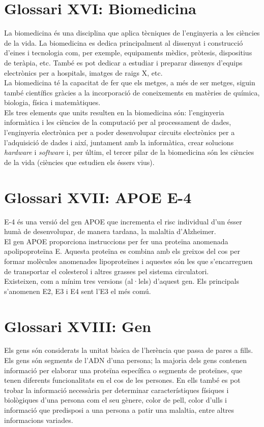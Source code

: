 \documentclass[a4paper,12pt]{report}
\begin{document}
\section*{Glossari XVI: Biomedicina}
La biomedicina és una disciplina que aplica tècniques de l'enginyeria a les ciències de la vida. La biomedicina es dedica principalment al dissenyat i construcció d'eines i tecnologia com, per exemple, equipaments mèdics, pròtesis, dispositius de teràpia, etc. També es pot dedicar a estudiar i preparar dissenys d'equips electrònics per a hospitals, imatges de raigs X, etc.\\
La biomedicina té la capacitat de fer que els metges, a més de ser metges, siguin també científics gràcies a la incorporació de coneixements en matèries de química, biologia, física i matemàtiques.\\
Els tres elements que units resulten en la biomedicina són: l'enginyeria informàtica i les ciències de la computació per al processament de dades, l'enginyeria electrònica per a poder desenvolupar circuits electrònics per a l'adquisició de dades i així, juntament amb la informàtica, crear solucions \textit{hardware} i \textit{software} i, per últim, el tercer pilar de la biomedicina són les ciències de la vida (ciències que estudien els éssers vius).
\section*{Glossari XVII: APOE E-4}
E-4 és una versió del gen APOE que incrementa el risc individual d'un ésser humà de desenvolupar, de manera tardana, la malaltia d'Alzheimer.\\
El gen APOE proporciona instruccions per fer una proteïna anomenada apolipoproteïna E. Aquesta proteïna es combina amb els greixos del cos per formar molècules anomenades lipoproteïnes i aquestes són les que s'encarreguen de transportar el colesterol i altres grasses pel sistema circulatori.\\
Existeixen, com a mínim tres versions (al·lels) d'aquest gen. Els principals s'anomenen E2, E3 i E4 sent l'E3 el més comú.
\section*{Glossari XVIII: Gen}
Els gens són considerats la unitat bàsica de l'herència que passa de pares a fills. Els gens són segments de l'ADN d'una persona; la majoria dels gens contenen informació per elaborar una proteïna específica o segments de proteïnes, que tenen diferents funcionalitats en el cos de les persones. En ells també es pot trobar la informació necessària per determinar característiques físiques i biològiques d'una persona com el seu gènere, color de pell, color d'ulls i informació que predisposi a una persona a patir una malaltia, entre altres informacions variades.
\end{document}
